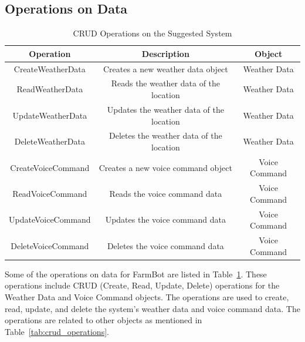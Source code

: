 \subsection{Operations on Data}

\begin{table}[H]
    \centering
    \begin{tabular}{|c|c|c|}
        \hline
        \textbf{Operation} & \textbf{Description}                     & \textbf{Object} \\
        \hline
        CreateWeatherData  & Creates a new weather data object        & Weather Data    \\
        \hline
        ReadWeatherData    & Reads the weather data of the location   & Weather Data    \\
        \hline
        UpdateWeatherData  & Updates the weather data of the location & Weather Data    \\
        \hline
        DeleteWeatherData  & Deletes the weather data of the location & Weather Data    \\
        \hline
        CreateVoiceCommand & Creates a new voice command object       & Voice Command   \\
        \hline
        ReadVoiceCommand   & Reads the voice command data             & Voice Command   \\
        \hline
        UpdateVoiceCommand & Updates the voice command data           & Voice Command   \\
        \hline
        DeleteVoiceCommand & Deletes the voice command data           & Voice Command   \\
        \hline
    \end{tabular}
    \caption{CRUD Operations on the Suggested System}\label{tab:operations_on_data}
\end{table}

Some of the operations on data for FarmBot are listed in Table~\ref{tab:operations_on_data}. These operations include CRUD (Create, Read, Update, Delete) operations for the Weather Data and Voice Command objects. The operations are used to create, read, update, and delete the system's weather data and voice command data. The operations are related to other objects as mentioned in Table~\ref{tab:crud_operations}.

